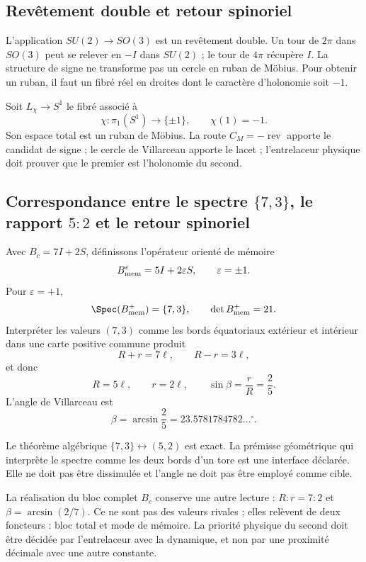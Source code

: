 \subsection{Revêtement double et retour spinoriel}

L’application \(SU(2)\to SO(3)\) est un revêtement double. Un tour de
\(2\pi\) dans \(SO(3)\) peut se relever en \(-I\) dans \(SU(2)\) ; le tour de
\(4\pi\) récupère \(I\). La structure de signe ne transforme pas un cercle en
ruban de Möbius. Pour obtenir un ruban, il faut un fibré réel en droites
dont le caractère d’holonomie soit \(-1\).

Soit \(L_\chi\to S^1\) le fibré associé à
\[
\chi:\pi_1(S^1)\longrightarrow\{\pm1\},
\qquad \chi(1)=-1.
\]
Son espace total est un ruban de Möbius. La route \(C_M=-\operatorname{rev}\)
apporte le candidat de signe ; le cercle de Villarceau apporte le lacet ;
l’entrelaceur physique doit prouver que le premier est l’holonomie du second.

\subsection{Correspondance entre le spectre \texorpdfstring{\(\{7,3\}\)}{{7,3}}, le rapport \texorpdfstring{\(5{:}2\)}{5:2} et le retour spinoriel}

Avec \(B_c=7I+2S\), définissons l’opérateur orienté de mémoire
\[
B_{\rm mem}^{\varepsilon}=5I+2\varepsilon S,
\qquad\varepsilon=\pm1.
\]
Pour \(\varepsilon=+1\),
\[
\Spec(B_{\rm mem}^{+})=\{7,3\},
\qquad\det B_{\rm mem}^{+}=21.
\]
Interpréter les valeurs \((7,3)\) comme les bords équatoriaux extérieur et intérieur
dans une carte positive commune produit
\[
R+r=7\ell,\qquad R-r=3\ell,
\]
et donc
\[
R=5\ell,\qquad r=2\ell,\qquad
\sin\beta=\frac rR=\frac25.
\]
L’angle de Villarceau est
\[
\beta=\arcsin\frac25
=23.5781784782\ldots^\circ.
\]

Le théorème algébrique \(\{7,3\}\leftrightarrow(5,2)\) est exact. La prémisse
géométrique qui interprète le spectre comme les deux bords d’un tore est une
interface déclarée. Elle ne doit pas être dissimulée et l’angle ne doit pas être employé comme cible.

La réalisation du bloc complet \(B_c\) conserve une autre lecture :
\(R:r=7:2\) et \(\beta=\arcsin(2/7)\). Ce ne sont pas des valeurs rivales ; elles relèvent de
deux foncteurs : bloc total et mode de mémoire. La priorité physique du second
doit être décidée par l’entrelaceur avec la dynamique, et non par une proximité décimale avec
une autre constante.

